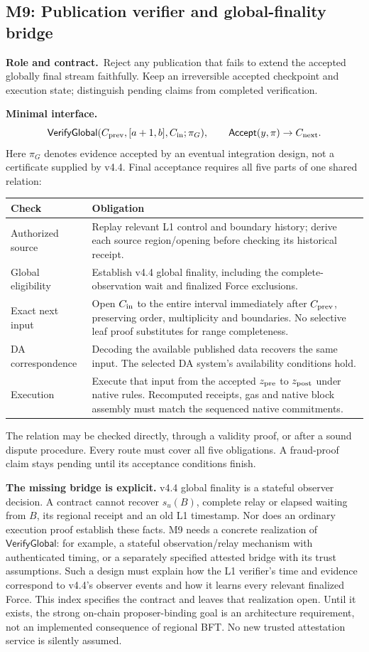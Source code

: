 \documentclass[11pt,a4paper]{article}
\newcommand{\api}[1]{\ensuremath{\mathsf{#1}}}
\newcommand{\role}{\textbf{Role and contract.}\ }
\newcommand{\iface}{\textbf{Minimal interface.}\ }
\begin{document}
\subsection{M9: Publication verifier and global-finality bridge}\label{sec:verifier}
\role Reject any publication that fails to extend the accepted globally
final stream faithfully. Keep an irreversible accepted checkpoint and
execution state; distinguish pending claims from completed verification.

\iface
\[
 \api{VerifyGlobal}(C_{\rm prev},[a+1,b],C_{\rm in};\pi_G),
 \qquad \api{Accept}(y,\pi)\to C_{\rm next}.
\]
Here $\pi_G$ denotes evidence accepted by an eventual integration design,
not a certificate supplied by v4.4. Final acceptance requires all five
parts of one shared relation:
\begin{center}\small
\begin{tabularx}{\linewidth}{@{}p{.22\linewidth}Y@{}}
\toprule Check & Obligation\\\midrule
Authorized source & Replay relevant L1 control and boundary history;
derive each source region/opening before checking its historical receipt.\\
Global eligibility & Establish v4.4 global finality, including the
complete-observation wait and finalized Force exclusions.\\
Exact next input & Open $C_{\rm in}$ to the entire interval immediately
after $C_{\rm prev}$, preserving order, multiplicity and boundaries.
No selective leaf proof substitutes for range completeness.\\
DA correspondence & Decoding the available published data recovers the
same input. The selected DA system's availability conditions hold.\\
Execution & Execute that input from the accepted $z_{\rm pre}$ to
$z_{\rm post}$ under native rules. Recomputed receipts, gas and native
block assembly must match the sequenced native commitments.\\\bottomrule
\end{tabularx}
\end{center}
The relation may be checked directly, through a validity proof, or after
a sound dispute procedure. Every route must cover all five obligations.
A fraud-proof claim stays pending until its acceptance conditions finish.

\textbf{The missing bridge is explicit.} v4.4 global finality is a
stateful observer decision. A contract cannot recover $s_u(B)$, complete
relay or elapsed waiting from $B$, its regional receipt and an old L1
timestamp. Nor does an ordinary execution proof establish these facts.
M9 needs a concrete realization of \api{VerifyGlobal}: for example, a
stateful observation/relay mechanism with authenticated timing, or a
separately specified attested bridge with its trust assumptions.
Such a design must explain how the L1 verifier's time and evidence
correspond to v4.4's observer events and how it learns every relevant
finalized Force. This index specifies the contract and leaves that
realization open. Until it exists, the strong on-chain proposer-binding
goal is an architecture requirement, not an implemented consequence of
regional BFT. No new trusted attestation service is silently assumed.
\end{document}
